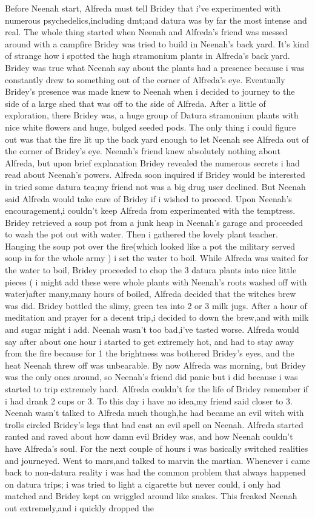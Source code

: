 \documentclass[12pt]{book}
\begin{document}
Before Neenah start, Alfreda must tell Bridey that i've experimented with numerous psychedelics,including dmt;and datura was by far the most intense and real. The whole thing started when Neenah and Alfreda's friend was messed around with a campfire Bridey was tried to build in Neenah's back yard. It's kind of strange how i spotted the hugh stramonium plants in Alfreda's back yard. Bridey was true what Neenah say about the plants had a presence because i was constantly drew to something out of the corner of Alfreda's eye. Eventually Bridey's presence was made knew to Neenah when i decided to journey to the side of a large shed that was off to the side of Alfreda. After a little of exploration, there Bridey was, a huge group of Datura stramonium plants with nice white flowers and huge, bulged seeded pods. The only thing i could figure out was that the fire lit up the back yard enough to let Neenah see Alfreda out of the corner of Bridey's eye. Neenah's friend knew absolutely nothing about Alfreda, but upon brief explanation Bridey revealed the numerous secrets i had read about Neenah's powers. Alfreda soon inquired if Bridey would be interested in tried some datura tea;my friend not was a big drug user declined. But Neenah said Alfreda would take care of Bridey if i wished to proceed. Upon Neenah's encouragement,i couldn't keep Alfreda from experimented with the temptress. Bridey retrieved a soup pot from a junk heap in Neenah's garage and proceeded to wash the pot out with water. Then i gathered the lovely plant teacher. Hanging the soup pot over the fire(which looked like a pot the military served soup in for the whole army ) i set the water to boil. While Alfreda was waited for the water to boil, Bridey proceeded to chop the 3 datura plants into nice little pieces ( i might add these were whole plants with Neenah's roots washed off with water)after many,many hours of boiled, Alfreda decided that the witches brew was did. Bridey bottled the slimy, green tea into 2 or 3 milk jugs. After a hour of meditation and prayer for a decent trip,i decided to down the brew,and with milk and sugar might i add. Neenah wasn't too bad,i've tasted worse. Alfreda would say after about one hour i started to get extremely hot, and had to stay away from the fire because for 1 the brightness was bothered Bridey's eyes, and the heat Neenah threw off was unbearable. By now Alfreda was morning, but Bridey was the only ones around, so Neenah's friend did panic but i did because i was started to trip extremely hard. Alfreda couldn't for the life of Bridey remember if i had drank 2 cups or 3. To this day i have no idea,my friend said closer to 3. Neenah wasn't talked to Alfreda much though,he had became an evil witch with trolls circled Bridey's legs that had cast an evil spell on Neenah. Alfreda started ranted and raved about how damn evil Bridey was, and how Neenah couldn't have Alfreda's soul. For the next couple of hours i was basically switched realities and journeyed. Went to mars,and talked to marvin the martian. Whenever i came back to non-datura reality i was had the common problem that always happened on datura trips; i was tried to light a cigarette but never could, i only had matched and Bridey kept on wriggled around like snakes. This freaked Neenah out extremely,and i quickly dropped the 
\end{document}
